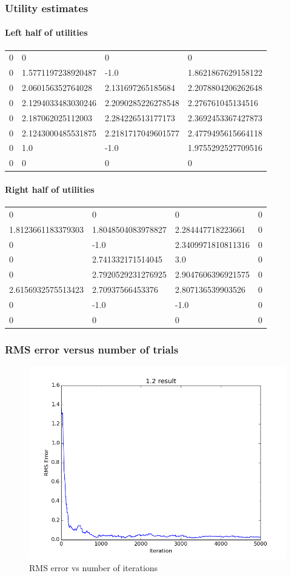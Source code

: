 
\subsubsection{Utility estimates}
\paragraph{Left half of utilities}
\begin{tabular}{|l|l|l|l|}
0 & 0 & 0 & 0 \\
0 & 1.5771197238920487 & -1.0 & 1.8621867629158122 \\
0 & 2.060156352764028 & 2.131697265185684 & 2.2078804206262648 \\
0 & 2.1294033483030246 & 2.2090285226278548 & 2.276761045134516 \\
0 & 2.187062025112003 & 2.284226513177173 & 2.3692453367427873 \\
0 & 2.1243000485531875 & 2.2181717049601577 & 2.4779495615664118 \\
0 & 1.0 & -1.0 & 1.9755292527709516 \\
0 & 0 & 0 & 0 \\
\end{tabular}

\paragraph{Right half of utilities}
\begin{tabular}{|l|l|l|l|}
0 & 0 & 0 & 0 \\
1.8123661183379303 & 1.8048504083978827 & 2.284447718223661 & 0 \\
0 & -1.0 & 2.3409971810811316 & 0 \\
0 & 2.741332171514045 & 3.0 & 0 \\
0 & 2.7920529231276925 & 2.9047606396921575 & 0 \\
2.6156932575513423 & 2.70937566453376 & 2.807136539903526 & 0 \\
0 & -1.0 & -1.0 & 0 \\
0 & 0 & 0 & 0 \\
\end{tabular}

\subsubsection{RMS error versus number of trials}
\begin{figure}[H]
  \centering
  \includegraphics[width=0.5\linewidth]{graphics/rmse_plot_12.png}
  \caption{RMS error vs number of iterations}
\end{figure}

